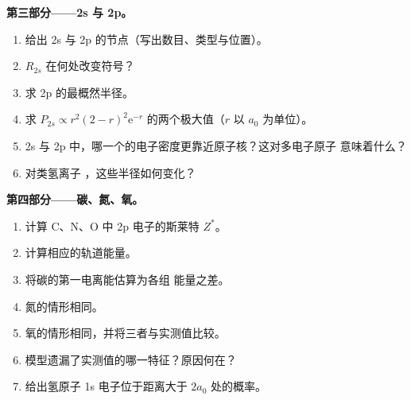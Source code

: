 \begin{problem}
\medskip
\noindent\textbf{第三部分——2s 与 2p。}
\begin{enumerate}[resume]
  \item 给出 2s 与 2p 的节点（写出数目、类型与位置）。
  \item $R_{2s}$ 在何处改变符号？
  \item 求 2p 的最概然半径。
  \item 求 $P_{2s} \propto r^2(2 - r)^2\mathrm e^{-r}$ 的两个极大值（$r$ 以
        $a_0$ 为单位）。
  \item 2s 与 2p 中，哪一个的电子密度更靠近原子核？这对多电子原子
        意味着什么？
  \item 对类氢离子 ，这些半径如何变化？
\end{enumerate}

\medskip
\noindent\textbf{第四部分——碳、氮、氧。}
\begin{enumerate}[resume]
  \item 计算 C、N、O 中 2p 电子的斯莱特 $Z^*$。
  \item 计算相应的轨道能量。
  \item 将碳的第一电离能估算为各组
        能量之差。
  \item 氮的情形相同。
  \item 氧的情形相同，并将三者与实测值比较。
  \item 模型遗漏了实测值的哪一特征？原因何在？
  \item 给出氢原子 1s 电子位于距离大于
        $2a_0$ 处的概率。
\end{enumerate}
\end{problem}
